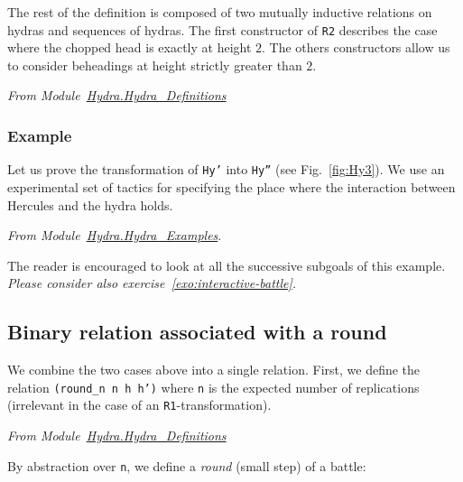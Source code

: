 


The rest of the definition is composed of two mutually inductive relations on hydras and sequences of hydras. The first constructor of \texttt{R2} describes the case where the chopped head is exactly at height $2$. The others constructors allow us to consider beheadings at height strictly greater than $2$.


\vspace{4pt}
\emph{From Module~\href{../theories/html/hydras.Hydra.Hydra_Definitions.html\#R2}{Hydra.Hydra\_Definitions}}



\subsubsection{Example}
Let us prove the transformation of \texttt{Hy'} into \texttt{Hy''} (see Fig.~\vref{fig:Hy3}). We use an experimental set of tactics for specifying the place where the 
interaction between Hercules and the hydra holds. 


\vspace{4pt}\emph{From Module~\href{../theories/html/hydras.Hydra.Hydra_Examples.html}{Hydra.Hydra\_Examples}}. 




The reader is encouraged to look at all the successive subgoals of this example.
\emph{Please consider also exercise~\vref{exo:interactive-battle}.}


\subsection{Binary relation associated with a round}

We combine the two cases above into a single relation.
First,  we define the  relation \texttt{(round\_n n h h')} where \texttt{n} is the expected number of  replications (irrelevant in the case of an \texttt{R1}-transformation).

\vspace{4pt}
\emph{From Module~\href{../theories/html/hydras.Hydra.Hydra_Definitions.html\#round_n}{Hydra.Hydra\_Definitions}}




By abstraction over \texttt{n}, we define a \emph{round} (small step) of a battle:

